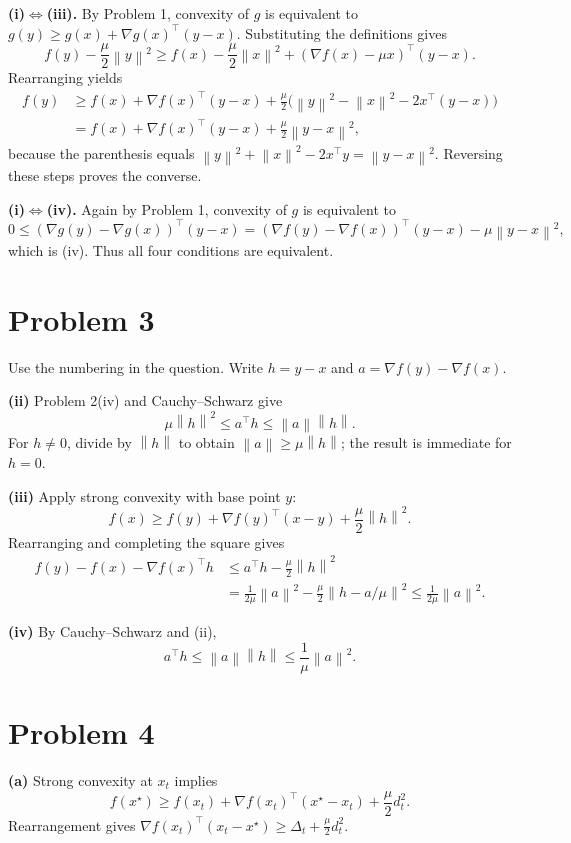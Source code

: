 \documentclass[11pt]{article}
\newcommand{\norm}[1]{\left\lVert#1\right\rVert}
\begin{document}
\textbf{(i)$\Leftrightarrow$(iii).}
By Problem 1, convexity of $g$ is equivalent to
$g(y)\geq g(x)+\nabla g(x)^\top(y-x)$.
Substituting the definitions gives
\[
 f(y)-\frac\mu2\norm y^2
 \geq f(x)-\frac\mu2\norm x^2
 +(\nabla f(x)-\mu x)^\top(y-x).
\]
Rearranging yields
\begin{align*}
 f(y)&\geq f(x)+\nabla f(x)^\top(y-x)
 +\frac\mu2\big(\norm y^2-\norm x^2-2x^\top(y-x)\big)\\
 &=f(x)+\nabla f(x)^\top(y-x)+\frac\mu2\norm{y-x}^2,
\end{align*}
because the parenthesis equals
$\norm y^2+\norm x^2-2x^\top y=\norm{y-x}^2$.
Reversing these steps proves the converse.

\textbf{(i)$\Leftrightarrow$(iv).}
Again by Problem 1, convexity of $g$ is equivalent to
\[
 0\leq(\nabla g(y)-\nabla g(x))^\top(y-x)
 =(\nabla f(y)-\nabla f(x))^\top(y-x)-\mu\norm{y-x}^2,
\]
which is (iv). Thus all four conditions are equivalent.

\section*{Problem 3}
Use the numbering in the question. Write $h=y-x$ and
$a=\nabla f(y)-\nabla f(x)$.

\textbf{(ii)} Problem 2(iv) and Cauchy--Schwarz give
\[
 \mu\norm h^2\leq a^\top h\leq\norm a\norm h.
\]
For $h\ne0$, divide by $\norm h$ to obtain $\norm a\geq\mu\norm h$;
the result is immediate for $h=0$.

\textbf{(iii)} Apply strong convexity with base point $y$:
\[
 f(x)\geq f(y)+\nabla f(y)^\top(x-y)+\frac\mu2\norm h^2.
\]
Rearranging and completing the square gives
\begin{align*}
 f(y)-f(x)-\nabla f(x)^\top h
 &\leq a^\top h-\frac\mu2\norm h^2\\
 &=\frac1{2\mu}\norm a^2-\frac\mu2\norm{h-a/\mu}^2
 \leq\frac1{2\mu}\norm a^2.
\end{align*}

\textbf{(iv)} By Cauchy--Schwarz and (ii),
\[
 a^\top h\leq\norm a\norm h\leq\frac1\mu\norm a^2.
\]

\section*{Problem 4}
\textbf{(a)} Strong convexity at $x_t$ implies
\[
 f(x^\star)\geq f(x_t)+\nabla f(x_t)^\top(x^\star-x_t)
 +\frac\mu2 d_t^2.
\]
Rearrangement gives
$\nabla f(x_t)^\top(x_t-x^\star)\geq\Delta_t+\frac\mu2d_t^2$.
\end{document}
